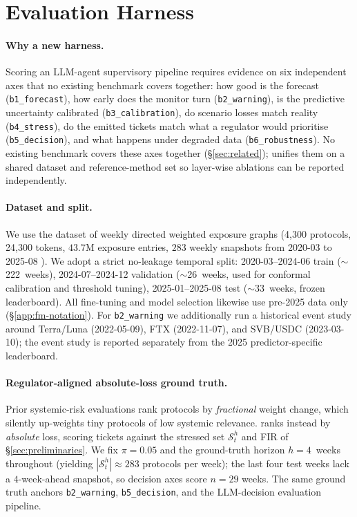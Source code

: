 \section{Evaluation Harness}
\label{sec:bench}

\paragraph{Why a new harness.}
Scoring an LLM-agent supervisory pipeline requires evidence on six
independent axes that no existing benchmark covers together: how
good is the forecast (\texttt{b1\_forecast}), how early does the
monitor turn (\texttt{b2\_warning}), is the predictive uncertainty
calibrated (\texttt{b3\_calibration}), do scenario losses match
reality (\texttt{b4\_stress}), do the emitted tickets match what a
regulator would prioritise (\texttt{b5\_decision}), and what happens
under degraded data (\texttt{b6\_robustness}). No existing
benchmark covers these axes together (\S\ref{sec:related});
\benchname{} unifies them on a shared dataset and
reference-method set so layer-wise ablations can be reported
independently.

\paragraph{Dataset and split.}
We use the \corpusname{} dataset of weekly directed weighted
exposure graphs (4{,}300 protocols, 24{,}300 tokens, $43.7$M
exposure entries, $283$ weekly snapshots from 2020-03 to 2025-08
\citep{wu2025dexposuredatasetbenchmarksinterprotocol}). We adopt a
strict no-leakage temporal split: 2020-03--2024-06 train
($\sim$222~weeks), 2024-07--2024-12 validation ($\sim$26~weeks, used
for conformal calibration and threshold tuning), 2025-01--2025-08
test ($\sim$33~weeks, frozen leaderboard). All \fmname{}
fine-tuning and model selection likewise use pre-2025 data only
(\S\ref{app:fm-notation}). For
\texttt{b2\_warning} we additionally run a historical event study
around Terra/Luna (2022-05-09), FTX (2022-11-07), and SVB/USDC
(2023-03-10); the event study is reported separately from the 2025
predictor-specific leaderboard.

\paragraph{Regulator-aligned absolute-loss ground truth.}
Prior systemic-risk evaluations rank protocols by \emph{fractional}
weight change, which silently up-weights tiny protocols of low
systemic relevance. \benchname{} ranks instead by \emph{absolute}
loss, scoring tickets against the stressed set $\mathcal{S}_t^h$
and FIR of \S\ref{sec:preliminaries}.
We fix $\pi\!=\!0.05$ and the ground-truth horizon $h\!=\!4$~weeks
throughout (yielding $|\mathcal{S}_t^h|\!\approx\!283$ protocols
per week); the last four test weeks lack a $4$-week-ahead
snapshot, so decision axes score $n\!=\!29$ weeks. The same
ground truth anchors
\texttt{b2\_warning}, \texttt{b5\_decision}, and the LLM-decision
evaluation pipeline.

